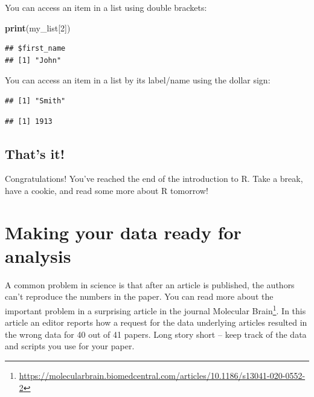 \documentclass[
]{krantz}
\makeatletter
\newenvironment{Shaded}{\begin{snugshade}}{\end{snugshade}}
\newcommand{\DecValTok}[1]{\textcolor[rgb]{0.06,0.06,0.06}{#1}}
\newcommand{\KeywordTok}[1]{\textcolor[rgb]{0.27,0.27,0.27}{\textbf{#1}}}
\newcommand{\NormalTok}[1]{#1}
\newcommand{\OperatorTok}[1]{\textcolor[rgb]{0.43,0.43,0.43}{\textbf{#1}}}
\renewcommand{\href}[2]{#2\footnote{\url{#1}}}
\newenvironment{kframe}{%
\medskip{}
\setlength{\fboxsep}{.8em}
 \def\at@end@of@kframe{}%
 \ifinner\ifhmode%
  \def\at@end@of@kframe{\end{minipage}}%
  \begin{minipage}{\columnwidth}%
 \fi\fi%
 \def\FrameCommand##1{\hskip\@totalleftmargin \hskip-\fboxsep
 \colorbox{shadecolor}{##1}\hskip-\fboxsep
     \hskip-\linewidth \hskip-\@totalleftmargin \hskip\columnwidth}%
 \MakeFramed {\advance\hsize-\width
   \@totalleftmargin\z@ \linewidth\hsize
   \@setminipage}}%
 {\par\unskip\endMakeFramed%
 \at@end@of@kframe}
\renewenvironment{Shaded}{\begin{kframe}}{\end{kframe}}
\makeatother
\begin{document}
You can access an item in a list using double brackets:

\begin{Shaded}
\begin{Highlighting}[]
\KeywordTok{print}\NormalTok{(my_list[}\DecValTok{2}\NormalTok{])}
\end{Highlighting}
\end{Shaded}

\begin{verbatim}
## $first_name
## [1] "John"
\end{verbatim}

You can access an item in a list by its label/name using the dollar sign:

\begin{Shaded}
\end{Shaded}

\begin{verbatim}
## [1] "Smith"
\end{verbatim}

\begin{Shaded}
\end{Shaded}

\begin{verbatim}
## [1] 1913
\end{verbatim}

\hypertarget{thats-it}{%
\section{That's it!}\label{thats-it}}

Congratulations! You've reached the end of the introduction to R. Take a break, have a cookie, and read some more about R tomorrow!

\hypertarget{making-your-data-ready-for-analysis}{%
\chapter{Making your data ready for analysis}\label{making-your-data-ready-for-analysis}}

A common problem in science is that after an article is published, the authors can't reproduce the numbers in the paper. You can read more about the important problem in a surprising article in the journal \href{https://molecularbrain.biomedcentral.com/articles/10.1186/s13041-020-0552-2}{Molecular Brain}. In this article an editor reports how a request for the data underlying articles resulted in the wrong data for 40 out of 41 papers. Long story short -- keep track of the data and scripts you use for your paper.
\end{document}
